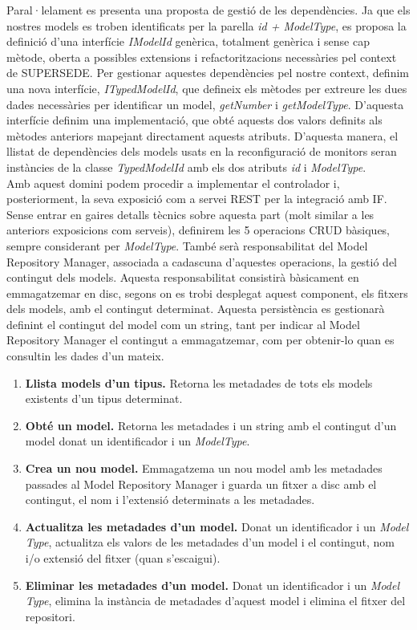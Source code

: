 Paral·lelament es presenta una proposta de gestió de les dependències. Ja que els nostres models es troben identificats per la parella \textit{id + ModelType}, es proposa la definició d'una interfície \textit{IModelId} genèrica, totalment genèrica i sense cap mètode, oberta a possibles extensions i refactoritzacions necessàries pel context de SUPERSEDE. Per gestionar aquestes dependències pel nostre context, definim una nova interfície, \textit{ITypedModelId}, que defineix els mètodes per extreure les dues dades necessàries per identificar un model, \textit{getNumber} i \textit{getModelType}. D'aquesta interfície definim una implementació, que obté aquests dos valors definits als mètodes anteriors mapejant directament aquests atributs. D'aquesta manera, el llistat de dependències dels models usats en la reconfiguració de monitors seran instàncies de la classe \textit{TypedModelId} amb els dos atributs \textit{id} i \textit{ModelType}.\\ 

Amb aquest domini podem procedir a implementar el controlador i, posteriorment, la seva exposició com a servei REST per la integració amb IF. Sense entrar en gaires detalls tècnics sobre aquesta part (molt similar a les anteriors exposicions com serveis), definirem les 5 operacions CRUD bàsiques, sempre considerant per \textit{ModelType}. També serà responsabilitat del Model Repository Manager, associada a cadascuna d'aquestes operacions, la gestió del contingut dels models. Aquesta responsabilitat consistirà bàsicament en emmagatzemar en disc, segons on es trobi desplegat aquest component, els fitxers dels models, amb el contingut determinat. Aquesta persistència es gestionarà definint el contingut del model com un string, tant per indicar al Model Repository Manager el contingut a emmagatzemar, com per obtenir-lo quan es consultin les dades d'un mateix.

\begin{enumerate}
\item \textbf{Llista models d'un tipus.} Retorna les metadades de tots els models existents d'un tipus determinat.
\item \textbf{Obté un model.} Retorna les metadades i un string amb el contingut d'un model donat un identificador i un \textit{ModelType}.
\item \textbf{Crea un nou model.} Emmagatzema un nou model amb les metadades passades al Model Repository Manager i guarda un fitxer a disc amb el contingut, el nom i l'extensió determinats a les metadades.
\item \textbf{Actualitza les metadades d'un model.} Donat un identificador i un \textit{Model Type}, actualitza els valors de les metadades d'un model i el contingut, nom i/o extensió del fitxer (quan s'escaigui). 
\item \textbf{Eliminar les metadades d'un model.} Donat un identificador i un \textit{Model Type}, elimina la instància de metadades d'aquest model i elimina el fitxer del repositori.
\end{enumerate}

